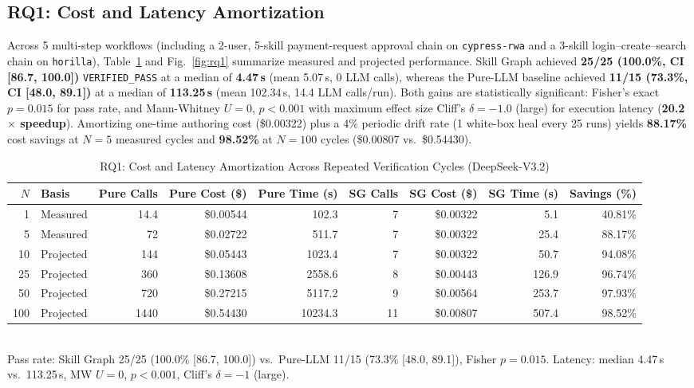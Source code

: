 \documentclass[conference]{IEEEtran}
\begin{document}
\subsection{RQ1: Cost and Latency Amortization}
Across 5 multi-step workflows (including a 2-user, 5-skill payment-request approval chain on \texttt{cypress-rwa} and a 3-skill login--create--search chain on \texttt{horilla}), Table~\ref{tab:rq1-amortization} and Fig.~\ref{fig:rq1} summarize measured and projected performance. Skill Graph achieved \textbf{25/25 (100.0\%, CI [86.7, 100.0])} \texttt{VERIFIED\_PASS} at a median of \textbf{4.47\,s} (mean 5.07\,s, 0 LLM calls), whereas the Pure-LLM baseline achieved \textbf{11/15 (73.3\%, CI [48.0, 89.1])} at a median of \textbf{113.25\,s} (mean 102.34\,s, 14.4 LLM calls/run). Both gains are statistically significant: Fisher's exact $p = 0.015$ for pass rate, and Mann-Whitney $U = 0$, $p < 0.001$ with maximum effect size Cliff's $\delta = -1.0$ (large) for execution latency (\textbf{20.2$\times$ speedup}). Amortizing one-time authoring cost (\$0.00322) plus a 4\% periodic drift rate (1 white-box heal every 25 runs) yields \textbf{88.17\%} cost savings at $N = 5$ measured cycles and \textbf{98.52\%} at $N = 100$ cycles (\$0.00807 vs.\ \$0.54430).

\begin{table}[t]
\centering
\caption{RQ1: Cost and Latency Amortization Across Repeated Verification Cycles (DeepSeek-V3.2)}
\label{tab:rq1-amortization}
\begin{tabular}{rlrrrrrrr}
\toprule
$N$ & Basis & Pure Calls & Pure Cost (\$) & Pure Time (s) & SG Calls & SG Cost (\$) & SG Time (s) & Savings (\%) \\
\midrule
1 & Measured & 14.4 & \$0.00544 & 102.3 & 7 & \$0.00322 & 5.1 & 40.81\% \\
5 & Measured & 72 & \$0.02722 & 511.7 & 7 & \$0.00322 & 25.4 & 88.17\% \\
10 & Projected & 144 & \$0.05443 & 1023.4 & 7 & \$0.00322 & 50.7 & 94.08\% \\
25 & Projected & 360 & \$0.13608 & 2558.6 & 8 & \$0.00443 & 126.9 & 96.74\% \\
50 & Projected & 720 & \$0.27215 & 5117.2 & 9 & \$0.00564 & 253.7 & 97.93\% \\
100 & Projected & 1440 & \$0.54430 & 10234.3 & 11 & \$0.00807 & 507.4 & 98.52\% \\
\bottomrule
\end{tabular}
\\[4pt]
\footnotesize{Pass rate: Skill Graph 25/25 (100.0\% [86.7, 100.0]) vs.\ Pure-LLM 11/15 (73.3\% [48.0, 89.1]), Fisher $p = 0.015$. Latency: median 4.47\,s vs.\ 113.25\,s, MW $U = 0$, $p < 0.001$, Cliff's $\delta = -1$ (large).}
\end{table}
\end{document}
